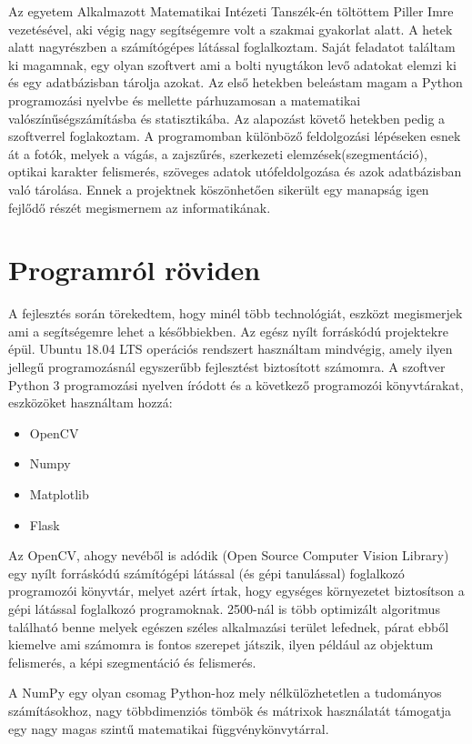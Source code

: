 \documentclass[a4paper,12pt]{article}
\begin{document}
Az egyetem Alkalmazott Matematikai Intézeti Tanszék-én töltöttem Piller Imre vezetésével, aki végig nagy segítségemre volt a szakmai gyakorlat alatt. A hetek alatt nagyrészben a számítógépes látással foglalkoztam. Saját feladatot találtam ki magamnak, egy olyan szoftvert ami a bolti nyugtákon levő adatokat elemzi ki és egy adatbázisban tárolja azokat. Az első hetekben beleástam magam a Python programozási nyelvbe és mellette párhuzamosan a matematikai valószínűségszámításba és statisztikába. Az alapozást követő hetekben pedig a szoftverrel foglakoztam. A programomban különböző feldolgozási lépéseken esnek át a fotók, melyek a vágás, a zajszűrés, szerkezeti elemzések(szegmentáció), optikai karakter felismerés, szöveges adatok utófeldolgozása és azok adatbázisban való tárolása. Ennek a projektnek köszönhetően sikerült egy manapság igen fejlődő részét megismernem az informatikának. 

\newpage
\section{Programról röviden}

A fejlesztés során törekedtem, hogy minél több technológiát, eszközt megismerjek ami a segítségemre lehet a későbbiekben. Az egész nyílt forráskódú projektekre épül. Ubuntu 18.04 LTS operációs rendszert használtam mindvégig, amely ilyen jellegű programozásnál egyszerűbb fejlesztést biztosított számomra. A szoftver Python 3 programozási nyelven íródott és a következő programozói könyvtárakat, eszközöket használtam hozzá: 

\begin{itemize}
	\item OpenCV
	\item Numpy
	\item Matplotlib	
	\item Flask	
\end{itemize}

Az OpenCV\cite{opencv}, ahogy nevéből is adódik (Open Source Computer Vision Library) egy nyílt forráskódú számítógépi látással (és gépi tanulással) foglalkozó programozói könyvtár, melyet azért írtak, hogy egységes környezetet biztosítson a gépi látással foglalkozó programoknak. 2500-nál is több optimizált algoritmus található benne melyek egészen széles alkalmazási terület lefednek, párat ebből kiemelve ami számomra is fontos szerepet játszik, ilyen például az objektum felismerés, a  képi szegmentáció és felismerés.

A NumPy egy olyan csomag Python-hoz mely nélkülözhetetlen a tudományos számításokhoz, nagy többdimenziós tömbök és mátrixok használatát támogatja egy nagy magas szintű matematikai függvénykönvytárral.
\end{document}

